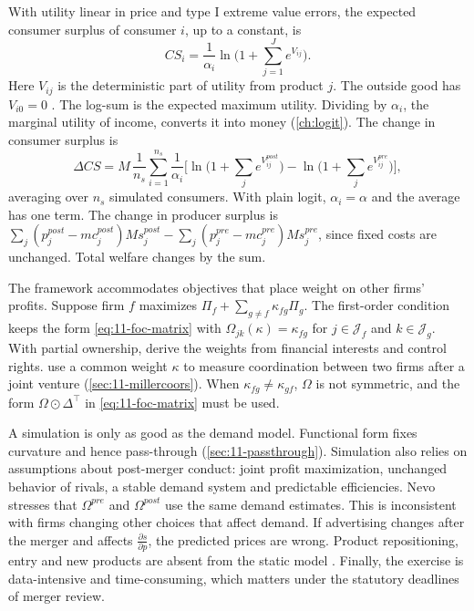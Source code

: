  With utility linear in price and type I extreme value errors, the expected consumer surplus of
consumer $i$, up to a constant, is
\begin{equation}\label{eq:11-cs}
  \mathit{CS}_i = \frac{1}{\alpha_i}\ln\Big(1 + \sum_{j=1}^{J} e^{V_{ij}}\Big) .
\end{equation}
Here $V_{ij}$ is the deterministic part of utility from product $j$. The outside good has $V_{i0} = 0$
\citep{SmallRosen1981,Trajtenberg1989}. The log-sum is the expected maximum utility. Dividing by $\alpha_i$, the
marginal utility of income, converts it into money (\cref{ch:logit}). The change in consumer surplus is
\begin{equation}\label{eq:11-dcs}
  \Delta \mathit{CS} = M\,\frac{1}{n_s}\sum_{i=1}^{n_s} \frac{1}{\alpha_i}
  \Big[\ln\Big(1 + \sum_j e^{V_{ij}^{post}}\Big) - \ln\Big(1 + \sum_j e^{V_{ij}^{pre}}\Big)\Big] ,
\end{equation}
averaging over $n_s$ simulated consumers. With plain logit, $\alpha_i = \alpha$ and the average has one term. The change
in producer surplus is $\sum_j (p_j^{post} - mc_j^{post}) M s_j^{post} - \sum_j (p_j^{pre} - mc_j^{pre}) M s_j^{pre}$,
since fixed costs are unchanged. Total welfare changes by the sum.

 The framework accommodates objectives that place weight on other firms' profits.
Suppose firm $f$ maximizes $\Pi_f + \sum_{g \ne f} \kappa_{fg}\Pi_g$. The first-order condition keeps the form
\eqref{eq:11-foc-matrix} with $\Omega_{jk}(\kappa) = \kappa_{fg}$ for $j \in \mathcal{J}_f$ and $k \in \mathcal{J}_g$.
With partial ownership, \citet{OBrienSalop2000} derive the weights from financial interests and control rights.
\citet{MillerWeinberg2017} use a common weight $\kappa$ to measure coordination between two firms after a joint venture
(\cref{sec:11-millercoors}). When $\kappa_{fg} \ne \kappa_{gf}$, $\Omega$ is not symmetric, and the form
$\Omega \odot \Delta^\top$ in \eqref{eq:11-foc-matrix} must be used.

 A simulation is only as good as the demand model. Functional form fixes curvature and hence
pass-through (\cref{sec:11-passthrough}). Simulation also relies on assumptions about post-merger conduct: joint profit
maximization, unchanged behavior of rivals, a stable demand system and predictable efficiencies. Nevo stresses that
$\Omega^{pre}$ and $\Omega^{post}$ use the same demand estimates. This is inconsistent with firms changing other choices
that affect demand. If advertising changes after the merger and affects $\frac{\partial s}{\partial p}$, the predicted
prices are wrong. Product repositioning, entry and new products are absent from the static model
\citep[pp.~23--25]{Nevo2000b}. Finally, the exercise is data-intensive and time-consuming, which matters under the
statutory deadlines of merger review.

